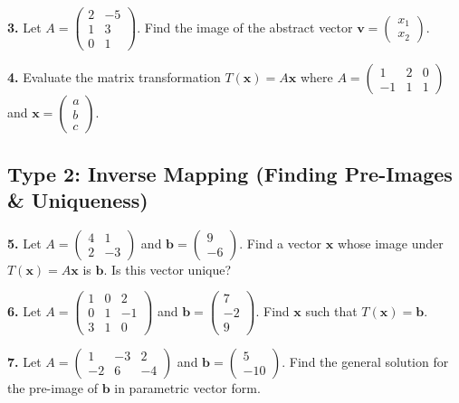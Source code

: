 \documentclass{article}
\begin{document}
\vspace{0.3cm}
\textbf{3.} Let $A = \begin{pmatrix} 2 & -5 \\ 1 & 3 \\ 0 & 1 \end{pmatrix}$. Find the image of the abstract vector $\mathbf{v} = \begin{pmatrix} x_1 \\ x_2 \end{pmatrix}$.

\vspace{0.3cm}
\textbf{4.} Evaluate the matrix transformation $T(\mathbf{x}) = A\mathbf{x}$ where $A = \begin{pmatrix} 1 & 2 & 0 \\ -1 & 1 & 1 \end{pmatrix}$ and $\mathbf{x} = \begin{pmatrix} a \\ b \\ c \end{pmatrix}$.

\subsection*{Type 2: Inverse Mapping (Finding Pre-Images \& Uniqueness)}
\textbf{5.} Let $A = \begin{pmatrix} 4 & 1 \\ 2 & -3 \end{pmatrix}$ and $\mathbf{b} = \begin{pmatrix} 9 \\ -6 \end{pmatrix}$. Find a vector $\mathbf{x}$ whose image under $T(\mathbf{x}) = A\mathbf{x}$ is $\mathbf{b}$. Is this vector unique?

\vspace{0.3cm}
\textbf{6.} Let $A = \begin{pmatrix} 1 & 0 & 2 \\ 0 & 1 & -1 \\ 3 & 1 & 0 \end{pmatrix}$ and $\mathbf{b} = \begin{pmatrix} 7 \\ -2 \\ 9 \end{pmatrix}$. Find $\mathbf{x}$ such that $T(\mathbf{x}) = \mathbf{b}$.

\vspace{0.3cm}
\textbf{7.} Let $A = \begin{pmatrix} 1 & -3 & 2 \\ -2 & 6 & -4 \end{pmatrix}$ and $\mathbf{b} = \begin{pmatrix} 5 \\ -10 \end{pmatrix}$. Find the general solution for the pre-image of $\mathbf{b}$ in parametric vector form.
\end{document}

